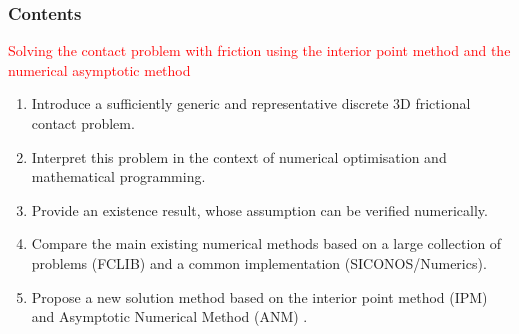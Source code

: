 \documentclass[8pt,red]{beamer}
\renewcommand{\tr}[1]{\textcolor{red}{#1}}
\begin{document}


  



\begin{frame}
  \frametitle{Contents}
  \begin{center}
   \tr{\Large Solving the contact problem with friction using the interior point method and the numerical asymptotic  method }
  \end{center}
  \begin{enumerate}
  \item Introduce a sufficiently generic and representative discrete 3D frictional contact problem.
  \item Interpret this problem in the context of numerical optimisation and mathematical programming.
  \item Provide an existence result, whose assumption can be verified numerically.
  \item Compare the main existing numerical methods based on a large collection of problems (FCLIB) and a common implementation (SICONOS/Numerics).
  \item Propose a new solution method based on the interior point method (IPM) and Asymptotic Numerical Method (ANM) .
  \end{enumerate}
  \addtocounter{page}{-2}
\end{frame}
\end{document}
